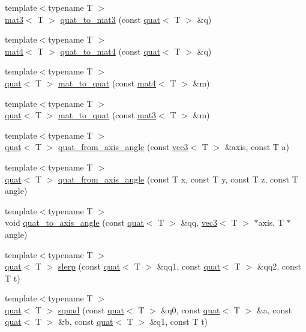 \begin{DoxyCompactItemize}
\item 
{\footnotesize template$<$typename T $>$ }\\\hyperlink{structvmath_1_1mat3}{mat3}$<$ T $>$ \hyperlink{namespacevmath_a5d9b5b66aee59cd807c3e0e3c844deec}{quat\-\_\-to\-\_\-mat3} (const \hyperlink{structvmath_1_1quat}{quat}$<$ T $>$ \&q)
\item 
{\footnotesize template$<$typename T $>$ }\\\hyperlink{structvmath_1_1mat4}{mat4}$<$ T $>$ \hyperlink{namespacevmath_a1d9b33a1d4c11bdb9a32ab17efddfa51}{quat\-\_\-to\-\_\-mat4} (const \hyperlink{structvmath_1_1quat}{quat}$<$ T $>$ \&q)
\item 
{\footnotesize template$<$typename T $>$ }\\\hyperlink{structvmath_1_1quat}{quat}$<$ T $>$ \hyperlink{namespacevmath_ad9bc88812baaef80fbe16689c9db472f}{mat\-\_\-to\-\_\-quat} (const \hyperlink{structvmath_1_1mat4}{mat4}$<$ T $>$ \&m)
\item 
{\footnotesize template$<$typename T $>$ }\\\hyperlink{structvmath_1_1quat}{quat}$<$ T $>$ \hyperlink{namespacevmath_af8dbbceb936b09ae18d7e410f7644093}{mat\-\_\-to\-\_\-quat} (const \hyperlink{structvmath_1_1mat3}{mat3}$<$ T $>$ \&m)
\item 
{\footnotesize template$<$typename T $>$ }\\\hyperlink{structvmath_1_1quat}{quat}$<$ T $>$ \hyperlink{namespacevmath_af8ec8741206a40b62765a4616ba09ade}{quat\-\_\-from\-\_\-axis\-\_\-angle} (const \hyperlink{structvmath_1_1vec3}{vec3}$<$ T $>$ \&axis, const T a)
\item 
{\footnotesize template$<$typename T $>$ }\\\hyperlink{structvmath_1_1quat}{quat}$<$ T $>$ \hyperlink{namespacevmath_aa01d974004689cf16143a1bfa43805ba}{quat\-\_\-from\-\_\-axis\-\_\-angle} (const T x, const T y, const T z, const T angle)
\item 
{\footnotesize template$<$typename T $>$ }\\void \hyperlink{namespacevmath_af7ee07c776100951dbadc9c7d1fc48de}{quat\-\_\-to\-\_\-axis\-\_\-angle} (const \hyperlink{structvmath_1_1quat}{quat}$<$ T $>$ \&qq, \hyperlink{structvmath_1_1vec3}{vec3}$<$ T $>$ $\ast$axis, T $\ast$angle)
\item 
{\footnotesize template$<$typename T $>$ }\\\hyperlink{structvmath_1_1quat}{quat}$<$ T $>$ \hyperlink{namespacevmath_ab5014ede27bda996f415a8bc61c03044}{slerp} (const \hyperlink{structvmath_1_1quat}{quat}$<$ T $>$ \&qq1, const \hyperlink{structvmath_1_1quat}{quat}$<$ T $>$ \&qq2, const T t)
\item 
{\footnotesize template$<$typename T $>$ }\\\hyperlink{structvmath_1_1quat}{quat}$<$ T $>$ \hyperlink{namespacevmath_aefd1a3d8d6e7e4077624241345e519a4}{squad} (const \hyperlink{structvmath_1_1quat}{quat}$<$ T $>$ \&q0, const \hyperlink{structvmath_1_1quat}{quat}$<$ T $>$ \&a, const \hyperlink{structvmath_1_1quat}{quat}$<$ T $>$ \&b, const \hyperlink{structvmath_1_1quat}{quat}$<$ T $>$ \&q1, const T t)
\end{DoxyCompactItemize}


